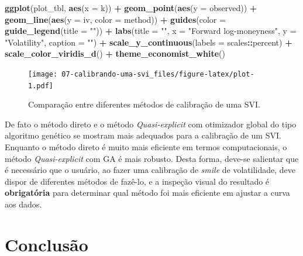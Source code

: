 \documentclass[]{book}
\newenvironment{Shaded}{\begin{snugshade}}{\end{snugshade}}
\newcommand{\KeywordTok}[1]{\textcolor[rgb]{0.13,0.29,0.53}{\textbf{#1}}}
\newcommand{\DataTypeTok}[1]{\textcolor[rgb]{0.13,0.29,0.53}{#1}}
\newcommand{\StringTok}[1]{\textcolor[rgb]{0.31,0.60,0.02}{#1}}
\newcommand{\OperatorTok}[1]{\textcolor[rgb]{0.81,0.36,0.00}{\textbf{#1}}}
\newcommand{\NormalTok}[1]{#1}
\theoremstyle{definition}
\theoremstyle{definition}
\theoremstyle{definition}
\theoremstyle{remark}
\begin{document}
\begin{Shaded}
\begin{Highlighting}[]
\KeywordTok{ggplot}\NormalTok{(plot_tbl, }\KeywordTok{aes}\NormalTok{(}\DataTypeTok{x =}\NormalTok{ k)) }\OperatorTok{+}\StringTok{ }
\StringTok{  }\KeywordTok{geom_point}\NormalTok{(}\KeywordTok{aes}\NormalTok{(}\DataTypeTok{y =}\NormalTok{ observed)) }\OperatorTok{+}
\StringTok{  }\KeywordTok{geom_line}\NormalTok{(}\KeywordTok{aes}\NormalTok{(}\DataTypeTok{y =}\NormalTok{ iv, }\DataTypeTok{color =}\NormalTok{ method)) }\OperatorTok{+}
\StringTok{  }\KeywordTok{guides}\NormalTok{(}\DataTypeTok{color =} \KeywordTok{guide_legend}\NormalTok{(}\DataTypeTok{title =} \StringTok{""}\NormalTok{)) }\OperatorTok{+}
\StringTok{  }\KeywordTok{labs}\NormalTok{(}\DataTypeTok{title =} \StringTok{""}\NormalTok{,}
       \DataTypeTok{x =} \StringTok{"Forward log-moneyness"}\NormalTok{,}
       \DataTypeTok{y =} \StringTok{"Volatility"}\NormalTok{,}
       \DataTypeTok{caption =} \StringTok{""}\NormalTok{) }\OperatorTok{+}
\StringTok{  }\KeywordTok{scale_y_continuous}\NormalTok{(}\DataTypeTok{labels =}\NormalTok{ scales}\OperatorTok{::}\NormalTok{percent) }\OperatorTok{+}
\StringTok{  }\KeywordTok{scale_color_viridis_d}\NormalTok{() }\OperatorTok{+}
\StringTok{  }\KeywordTok{theme_economist_white}\NormalTok{()}
\end{Highlighting}
\end{Shaded}

\begin{figure}
\centering
\texttt{[image: 07-calibrando-uma-svi\_files/figure-latex/plot-1.pdf]}
\caption{\label{fig:plot}Comparação entre diferentes métodos de calibração de uma
SVI.}
\end{figure}

De fato o método direto e o método \emph{Quasi-explicit} com otimizador
global do tipo algoritmo genético se mostram mais adequados para a
calibração de um SVI. Enquanto o método direto é muito mais eficiente em
termos computacionais, o método \emph{Quasi-explicit} com GA é mais
robusto. Desta forma, deve-se salientar que é necessário que o usuário,
ao fazer uma calibração de \emph{smile} de volatilidade, deve dispor de
diferentes métodos de fazê-lo, e a inspeção visual do resultado é
\textbf{obrigatória} para determinar qual método foi mais eficiente em
ajustar a curva aos dados.

\section{Conclusão}\label{conclusao-3}
\end{document}
